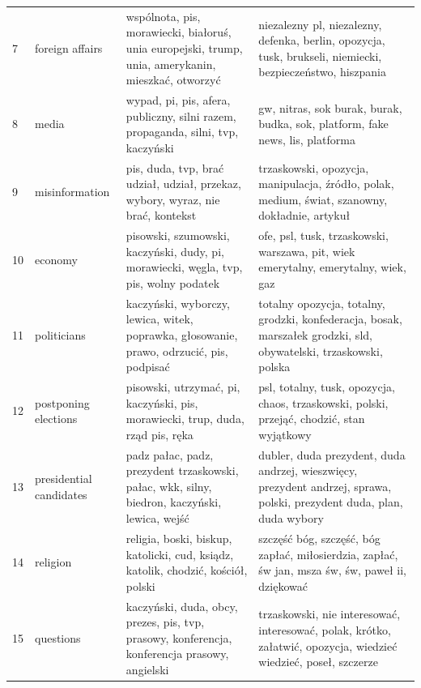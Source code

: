 \documentclass{article}
\begin{document}
\begin{otherlanguage}{polish}
\begin{longtable}{p{2cm}p{2cm}p{5cm}p{5cm}}
				7 &          foreign affairs &               wspólnota, pis, morawiecki, białoruś, unia europejski, trump, unia, amerykanin, mieszkać, otworzyć &              niezalezny pl, niezalezny, defenka, berlin, opozycja, tusk, brukseli, niemiecki, bezpieczeństwo, hiszpania \\
				8 &                    media &                                 wypad, pi, pis, afera, publiczny, silni razem, propaganda, silni, tvp, kaczyński &                                           gw, nitras, sok burak, burak, budka, sok, platform, fake news, lis, platforma \\
				9 &           misinformation &                                  pis, duda, tvp, brać udział, udział, przekaz, wybory, wyraz, nie brać, kontekst &                          trzaskowski, opozycja, manipulacja, źródło, polak, medium, świat, szanowny, dokładnie, artykuł \\
				10 &                  economy &                             pisowski, szumowski, kaczyński, dudy, pi, morawiecki, węgla, tvp, pis, wolny podatek &                                      ofe, psl, tusk, trzaskowski, warszawa, pit, wiek emerytalny, emerytalny, wiek, gaz \\
				11 &              politicians &                         kaczyński, wyborczy, lewica, witek, poprawka, głosowanie, prawo, odrzucić, pis, podpisać &       totalny opozycja, totalny, grodzki, konfederacja, bosak, marszałek grodzki, sld, obywatelski, trzaskowski, polska \\
				12 &     postponing elections &                                   pisowski, utrzymać, pi, kaczyński, pis, morawiecki, trup, duda, rząd pis, ręka &                              psl, totalny, tusk, opozycja, chaos, trzaskowski, polski, przejąć, chodzić, stan wyjątkowy \\
				13 &  presidential candidates &                    padz pałac, padz, prezydent trzaskowski, pałac, wkk, silny, biedron, kaczyński, lewica, wejść &  dubler, duda prezydent, duda andrzej, wieszwięcy, prezydent andrzej, sprawa, polski, prezydent duda, plan, duda wybory \\
				14 &                 religion &                                religia, boski, biskup, katolicki, cud, ksiądz, katolik, chodzić, kościół, polski &                        szczęść bóg, szczęść, bóg zapłać, miłosierdzia, zapłać, św jan, msza św, św, paweł ii, dziękować \\
				15 &                questions &                    kaczyński, duda, obcy, prezes, pis, tvp, prasowy, konferencja, konferencja prasowy, angielski &        trzaskowski, nie interesować, interesować, polak, krótko, załatwić, opozycja, wiedzieć wiedzieć, poseł, szczerze \\

\end{longtable}
\end{otherlanguage}
\end{document}
